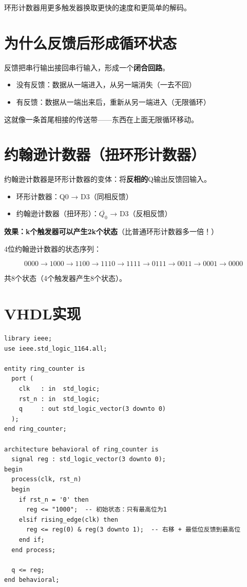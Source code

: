 环形计数器用更多触发器换取更快的速度和更简单的解码。

\section{为什么反馈后形成循环状态}

反馈把串行输出接回串行输入，形成一个\textbf{闭合回路}。

\begin{itemize}
  \item 没有反馈：数据从一端进入，从另一端消失（一去不回）
  \item 有反馈：数据从一端出来后，重新从另一端进入（无限循环）
\end{itemize}

这就像一条首尾相接的传送带——东西在上面无限循环移动。

\section{约翰逊计数器（扭环形计数器）}

约翰逊计数器是环形计数器的变体：将\textbf{反相的}Q输出反馈回输入。

\begin{itemize}
  \item 环形计数器：Q0 → D3（同相反馈）
  \item 约翰逊计数器（扭环形）：$\overline{Q_0}$ → D3（反相反馈）
\end{itemize}

\textbf{效果：k个触发器可以产生2k个状态}（比普通环形计数器多一倍！）

4位约翰逊计数器的状态序列：

$$0000 \to 1000 \to 1100 \to 1110 \to 1111 \to 0111 \to 0011 \to 0001 \to 0000$$

共8个状态（4个触发器产生8个状态）。

\section{VHDL实现}

\begin{lstlisting}[caption={4位环形计数器}]
library ieee;
use ieee.std_logic_1164.all;

entity ring_counter is
  port (
    clk   : in  std_logic;
    rst_n : in  std_logic;
    q     : out std_logic_vector(3 downto 0)
  );
end ring_counter;

architecture behavioral of ring_counter is
  signal reg : std_logic_vector(3 downto 0);
begin
  process(clk, rst_n)
  begin
    if rst_n = '0' then
      reg <= "1000";  -- 初始状态：只有最高位为1
    elsif rising_edge(clk) then
      reg <= reg(0) & reg(3 downto 1);  -- 右移 + 最低位反馈到最高位
    end if;
  end process;

  q <= reg;
end behavioral;
\end{lstlisting}

